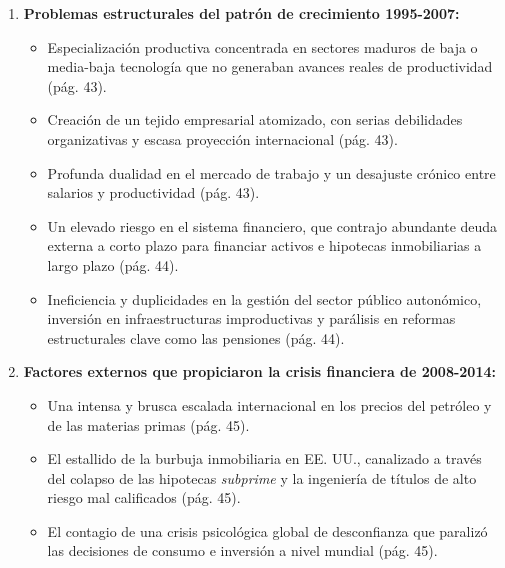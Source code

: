 \begin{enumerate}[label=\arabic*.]
    \item \textbf{Problemas estructurales del patrón de crecimiento 1995-2007:}
    \begin{itemize}
        \item Especialización productiva concentrada en sectores maduros de baja o media-baja tecnología que no generaban avances reales de productividad (pág. 43).
        \item Creación de un tejido empresarial atomizado, con serias debilidades organizativas y escasa proyección internacional (pág. 43).
        \item Profunda dualidad en el mercado de trabajo y un desajuste crónico entre salarios y productividad (pág. 43).
        \item Un elevado riesgo en el sistema financiero, que contrajo abundante deuda externa a corto plazo para financiar activos e hipotecas inmobiliarias a largo plazo (pág. 44).
        \item Ineficiencia y duplicidades en la gestión del sector público autonómico, inversión en infraestructuras improductivas y parálisis en reformas estructurales clave como las pensiones (pág. 44).
    \end{itemize}

    \item \textbf{Factores externos que propiciaron la crisis financiera de 2008-2014:}
    \begin{itemize}
        \item Una intensa y brusca escalada internacional en los precios del petróleo y de las materias primas (pág. 45).
        \item El estallido de la burbuja inmobiliaria en EE. UU., canalizado a través del colapso de las hipotecas \textit{subprime} y la ingeniería de títulos de alto riesgo mal calificados (pág. 45).
        \item El contagio de una crisis psicológica global de desconfianza que paralizó las decisiones de consumo e inversión a nivel mundial (pág. 45).
    \end{itemize}


\end{enumerate}
